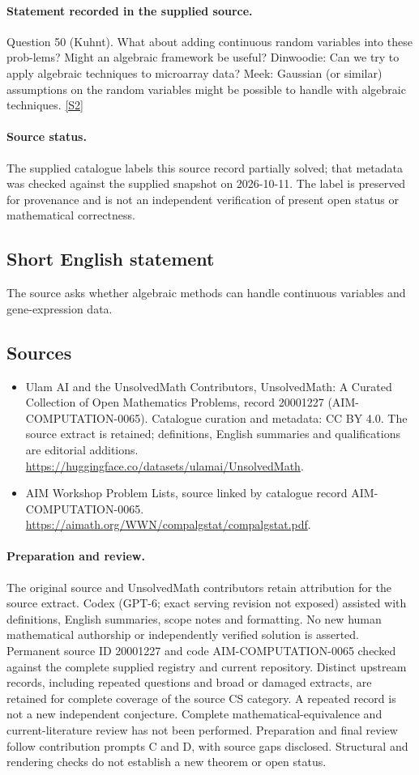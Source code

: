 \documentclass[11pt]{article}
\begin{document}
\paragraph{Statement recorded in the supplied source.}
Question 50 (Kuhnt). What about adding continuous random variables into these prob-lems? Might an algebraic framework be useful? Dinwoodie: Can we try to apply algebraic techniques to microarray data? Meek: Gaussian (or similar) assumptions on the random variables might be possible to handle with algebraic techniques. \href{https://aimath.org/WWN/compalgstat/compalgstat.pdf}{[S2]}
\paragraph{Source status.}
The supplied catalogue labels this source record partially solved; that metadata was checked against the supplied snapshot on 2026-10-11. The label is preserved for provenance and is not an independent verification of present open status or mathematical correctness.
\subsection{Short English statement}
The source asks whether algebraic methods can handle continuous variables and gene-expression data.
\subsection{Sources}
\begin{itemize}
\item[S1] Ulam AI and the UnsolvedMath Contributors, UnsolvedMath: A Curated Collection of Open Mathematics Problems, record 20001227 (AIM-COMPUTATION-0065). Catalogue curation and metadata: CC BY 4.0. The source extract is retained; definitions, English summaries and qualifications are editorial additions.
\url{https://huggingface.co/datasets/ulamai/UnsolvedMath}.
\item[S2] AIM Workshop Problem Lists, source linked by catalogue record AIM-COMPUTATION-0065.
\url{https://aimath.org/WWN/compalgstat/compalgstat.pdf}.
\end{itemize}
\paragraph{Preparation and review.}
The original source and UnsolvedMath contributors retain attribution for the source extract. Codex (GPT-6; exact serving revision not exposed) assisted with definitions, English summaries, scope notes and formatting. No new human mathematical authorship or independently verified solution is asserted. Permanent source ID 20001227 and code AIM-COMPUTATION-0065 checked against the complete supplied registry and current repository. Distinct upstream records, including repeated questions and broad or damaged extracts, are retained for complete coverage of the source CS category. A repeated record is not a new independent conjecture. Complete mathematical-equivalence and current-literature review has not been performed. Preparation and final review follow contribution prompts C and D, with source gaps disclosed. Structural and rendering checks do not establish a new theorem or open status.
\label{end:20001227}
\end{document}
